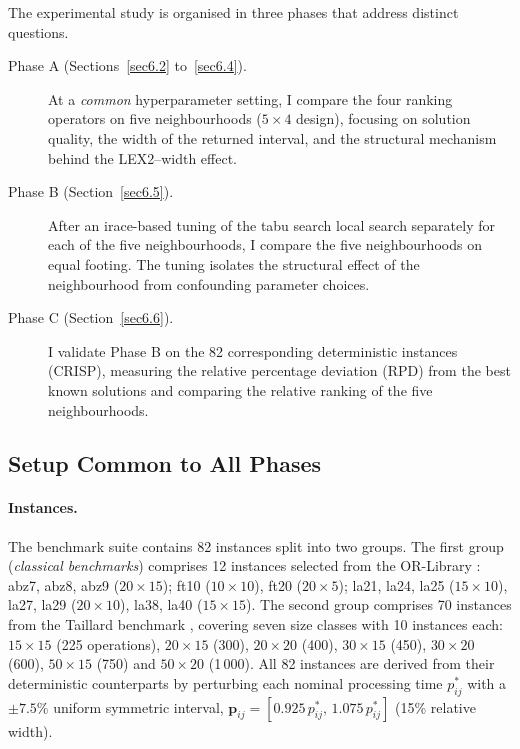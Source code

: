 \documentclass[preprint,12pt]{elsarticle}
\begin{document}
The experimental study is organised in three phases that address distinct questions.
\begin{description}
\item[Phase A (Sections~\ref{sec6.2} to~\ref{sec6.4}).] At a \emph{common} hyperparameter setting, I compare the four ranking operators on five neighbourhoods ($5 \times 4$ design), focusing on solution quality, the width of the returned interval, and the structural mechanism behind the LEX2--width effect.
\item[Phase B (Section~\ref{sec6.5}).] After an irace-based tuning of the tabu search local search separately for each of the five neighbourhoods, I compare the five neighbourhoods on equal footing. The tuning isolates the structural effect of the neighbourhood from confounding parameter choices.
\item[Phase C (Section~\ref{sec6.6}).] I validate Phase B on the 82 corresponding deterministic instances (CRISP), measuring the relative percentage deviation (RPD) from the best known solutions and comparing the relative ranking of the five neighbourhoods.
\end{description}

\subsection{Setup Common to All Phases}
\label{sec6.1}

\paragraph{Instances.} The benchmark suite contains 82 instances split into two groups. The first group (\emph{classical benchmarks}) comprises 12 instances selected from the OR-Library \cite{Beasley1990}: abz7, abz8, abz9 ($20\times15$); ft10 ($10\times10$), ft20 ($20\times5$); la21, la24, la25 ($15\times10$), la27, la29 ($20\times10$), la38, la40 ($15\times15$). The second group comprises 70 instances from the Taillard benchmark \cite{Taillard1993}, covering seven size classes with 10 instances each: $15\times15$ (225 operations), $20\times15$ (300), $20\times20$ (400), $30\times15$ (450), $30\times20$ (600), $50\times15$ (750) and $50\times20$ (1\,000). All 82 instances are derived from their deterministic counterparts by perturbing each nominal processing time $p_{ij}^{*}$ with a $\pm7.5\%$ uniform symmetric interval, $\mathbf{p}_{ij} = [0.925\,p_{ij}^{*},\, 1.075\,p_{ij}^{*}]$ (15\% relative width).
\end{document}
